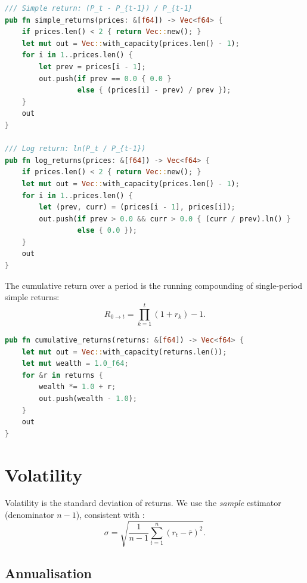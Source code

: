 \begin{lstlisting}[language=Rust]
/// Simple return: (P_t - P_{t-1}) / P_{t-1}
pub fn simple_returns(prices: &[f64]) -> Vec<f64> {
    if prices.len() < 2 { return Vec::new(); }
    let mut out = Vec::with_capacity(prices.len() - 1);
    for i in 1..prices.len() {
        let prev = prices[i - 1];
        out.push(if prev == 0.0 { 0.0 }
                 else { (prices[i] - prev) / prev });
    }
    out
}

/// Log return: ln(P_t / P_{t-1})
pub fn log_returns(prices: &[f64]) -> Vec<f64> {
    if prices.len() < 2 { return Vec::new(); }
    let mut out = Vec::with_capacity(prices.len() - 1);
    for i in 1..prices.len() {
        let (prev, curr) = (prices[i - 1], prices[i]);
        out.push(if prev > 0.0 && curr > 0.0 { (curr / prev).ln() }
                 else { 0.0 });
    }
    out
}
\end{lstlisting}


The cumulative return over a period is the running compounding of
single-period simple returns:
\[
R_{0 \to t} = \prod_{k=1}^{t}(1 + r_k) - 1.
\]

\begin{lstlisting}[language=Rust]
pub fn cumulative_returns(returns: &[f64]) -> Vec<f64> {
    let mut out = Vec::with_capacity(returns.len());
    let mut wealth = 1.0_f64;
    for &r in returns {
        wealth *= 1.0 + r;
        out.push(wealth - 1.0);
    }
    out
}
\end{lstlisting}

\section{Volatility}


Volatility is the standard deviation of returns. We use the \emph{sample}
estimator (denominator $n-1$), consistent with :
\[
\sigma = \sqrt{\frac{1}{n-1}\sum_{t=1}^{n}(r_t - \bar r)^2}.
\]

\subsection{Annualisation}

